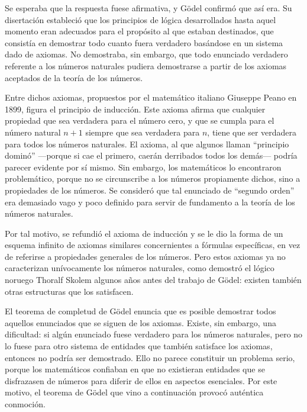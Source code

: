 \documentclass[a4paper, 12pt]{article}
\begin{document}
Se esperaba que la respuesta fuese afirmativa, y Gödel confirmó que así era. Su disertación estableció que los principios de lógica desarrollados hasta aquel momento eran adecuados para el propósito al que estaban destinados, que consistía en demostrar todo cuanto fuera verdadero basándose en un sistema dado de axiomas. No demostraba, sin embargo, que todo enunciado verdadero referente a los números naturales pudiera demostrarse a partir de los axiomas aceptados de la teoría de los números.

Entre dichos axiomas, propuestos por el matemático italiano Giuseppe Peano en 1899, figura el principio de inducción. Este axioma afirma que cualquier propiedad que sea verdadera para el número cero, y que se cumpla para el número natural $n+1$ siempre que sea verdadera para $n$, tiene que ser verdadera para todos los números naturales. El axioma, al que algunos llaman ``principio dominó'' ---porque si cae el primero, caerán derribados todos los demás--- podría parecer evidente por sí mismo. Sin embargo, los matemáticos lo encontraron problemático, porque no se circunscribe a los números propiamente dichos, sino a propiedades de los números. Se consideró que tal enunciado de ``segundo orden'' era demasiado vago y poco definido para servir de fundamento a la teoría de los números naturales.

Por tal motivo, se refundió el axioma de inducción y se le dio la forma de un esquema infinito de axiomas similares concernientes a fórmulas específicas, en vez de referirse a propiedades generales de los números. Pero estos axiomas ya no caracterizan unívocamente los números naturales, como demostró el lógico noruego Thoralf Skolem algunos años antes del trabajo de Gödel: existen también otras estructuras que los satisfacen.

El teorema de completud de Gödel enuncia que es posible demostrar todos aquellos enunciados que se siguen de los axiomas. Existe, sin embargo, una dificultad: si algún enunciado fuese verdadero para los números naturales, pero no lo fuese para otro sistema de entidades que también satisface los axiomas, entonces no podría ser demostrado. Ello no parece constituir un problema serio, porque los matemáticos confiaban en que no existieran entidades que se disfrazasen de números para diferir de ellos en aspectos esenciales. Por este motivo, el teorema de Gödel que vino a continuación provocó auténtica conmoción.
\end{document}
